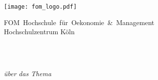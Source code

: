 \begin{titlepage}
    \noindent\begin{minipage}[c][.18\textwidth][t]{.18\textwidth}
        \flushleft
        \texttt{[image: fom\_logo.pdf]}
    \end{minipage}%
    \hfill
    \begin{minipage}[c][.18\textwidth][b]{.9\textwidth}
        \rmfamily
        {\large {FOM}~Hochschule~für~Oekonomie~\&~Management} \\
        {\large Hochschulzentrum Köln}
        \vspace{0.25cm}
    \end{minipage}

    \begin{flushleft}
        
        \vspace{2.0cm}

        {
            \rmfamily\Large
            \texplatetype\\
            \rmfamily\normalsize
            \textit{\texplatemodule}\\
        }

        \vspace{1.0cm}
        

        \vspace{1.0cm}

        {
            \rmfamily\normalsize
            \textit{über das Thema}
        }

        \vspace{0.1cm}

        {
            \rmfamily\LARGE
            \texplatetitle
        }


\end{flushleft}
\end{titlepage}
